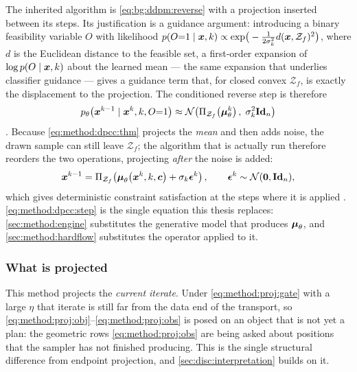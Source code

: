 The inherited algorithm is \eqref{eq:bg:ddpm:reverse} with a projection inserted between its
steps. Its justification is a guidance argument: introducing a binary feasibility variable
$O$ with likelihood
$p(O{=}1\mid\boldsymbol{x},k) \propto \exp\!\big(-\tfrac{1}{2\sigma_{k}^{2}}d(\boldsymbol{x},\mathcal{Z}_{f})^{2}\big)$,
where $d$ is the Euclidean distance to the feasible set, a first-order expansion of
$\log p(O\mid\boldsymbol{x},k)$ about the learned mean --- the same expansion that underlies classifier
guidance \parencite{dhariwal2021diffusion} --- gives a guidance term that, for closed convex
$\mathcal{Z}_{f}$, is exactly the displacement to the projection. The conditioned reverse step
is therefore
\begin{equation}\label{eq:method:dpcc:thm}
  p_{\theta}\!\left(\boldsymbol{x}^{k-1}\mid\boldsymbol{x}^{k},k,O{=}1\right)
  \approx \mathcal{N}\!\left(\Pi_{\mathcal{Z}_{f}}\!\left(\boldsymbol{\mu}_{\theta}^{k}\right),\;
    \sigma_{k}^{2}\textbf{Id}_{n}\right)
\end{equation}
\parencite[Theorem~1]{romer2025diffusion}. Because \eqref{eq:method:dpcc:thm} projects the
\emph{mean} and then adds noise, the drawn sample can still leave $\mathcal{Z}_{f}$; the
algorithm that is actually run therefore reorders the two operations, projecting \emph{after}
the noise is added:
\begin{equation}\label{eq:method:dpcc:step}
  \boldsymbol{x}^{k-1}
  = \Pi_{\mathcal{Z}_{f}}\!\left(
      \boldsymbol{\mu}_{\theta}\!\left(\boldsymbol{x}^{k},k,\boldsymbol{c}\right) + \sigma_{k}\boldsymbol{\epsilon}^{k}
    \right),
  \qquad \boldsymbol{\epsilon}^{k}\sim\mathcal{N}(\boldsymbol{0},\textbf{Id}_{n}),
\end{equation}
which gives deterministic constraint satisfaction at the steps where it is applied
\parencite[Eq.~16]{romer2025diffusion}. \eqref{eq:method:dpcc:step} is the single equation this
thesis replaces: \autoref{sec:method:engine} substitutes the generative model that produces
$\boldsymbol{\mu}_{\theta}$, and \autoref{sec:method:hardflow} substitutes the operator applied to it.

\subsubsection*{What is projected}

This method projects the \emph{current iterate}. Under \eqref{eq:method:proj:gate} with a large $\eta$
that iterate is still far from the data end of the transport, so
\eqref{eq:method:proj:obj}--\eqref{eq:method:proj:obs} is posed on an object that is not yet a
plan: the geometric rows \eqref{eq:method:proj:obs} are being asked about positions that the
sampler has not finished producing. This is the single structural difference from endpoint
projection, and \autoref{sec:disc:interpretation} builds on it.

